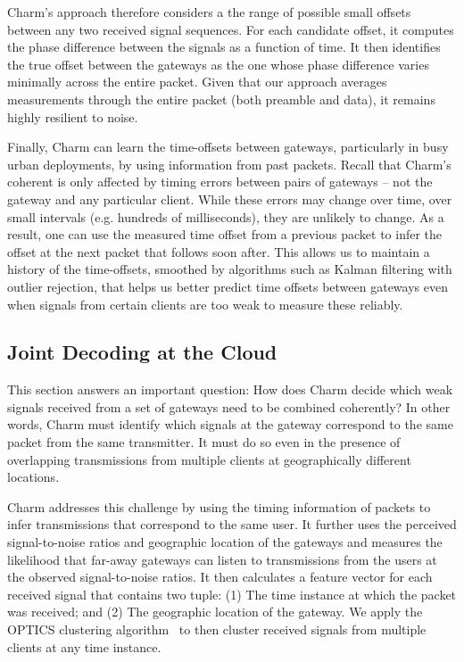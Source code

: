 Charm's approach therefore considers a the range of possible small offsets
between any two received signal sequences. For each candidate offset, it
computes the phase difference between the signals as a function of time. It
then identifies the true offset between the gateways as the one whose phase
difference varies minimally across the entire packet. Given that our approach
averages measurements through the entire packet (both preamble and data), it
remains highly resilient to noise.\vspace*{0.1in}


 Finally, Charm
can learn the time-offsets between gateways, particularly in busy urban
deployments, by using information from past packets. Recall that Charm's
coherent is only affected by timing errors between pairs of gateways -- not
the gateway and any particular client. While these errors may change over
time, over small intervals (e.g. hundreds of milliseconds), they are unlikely
to change. As a result, one can use the measured time offset from a previous
packet to infer the offset at the next packet that follows soon after. This
allows us to maintain a history of the time-offsets, smoothed by algorithms
such as Kalman filtering with outlier rejection, that helps us better predict
time offsets between gateways even when signals from certain clients are too
weak to measure these reliably.

\subsection{Joint Decoding at the Cloud}
\label{sec:joint-decoding-cloud}
This section answers an important question: How does Charm decide which weak
signals received from a set of gateways need to be combined coherently? In
other words, Charm must identify which signals at the gateway correspond to
the same packet from the same transmitter. It must do so even in the presence
of overlapping transmissions from multiple clients at geographically different
locations.

 Charm addresses this challenge by
using the timing information of packets to infer transmissions that correspond
to the same user. It further uses the perceived signal-to-noise ratios and
geographic location of the gateways and measures the likelihood that far-away
gateways can listen to transmissions from the users at the observed
signal-to-noise ratios. It then calculates a feature vector for each received
signal that contains two tuple: (1) The time instance at which the packet was
received; and (2) The geographic location of the gateway. We apply the OPTICS
clustering algorithm~\cite{ankerst1999optics} to then cluster received signals
from multiple clients at any time instance.

